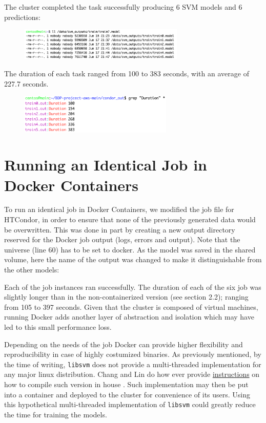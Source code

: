 \documentclass{article}
\begin{document}
The cluster completed the task successfully producing 6 SVM models and 6 predictions: %
\begin{figure}[!h]
    \includegraphics[width=0.7\textwidth]{./img/condor_output.model.png}
\end{figure}
\FloatBarrier%

The duration of each task ranged from 100 to 383 seconds, with an average of 227.7 seconds.

\begin{figure}[!h]
    \includegraphics[width=0.65\textwidth]{./img/condor_duration_job.png}
\end{figure}
\FloatBarrier%

\section{Running an Identical Job in Docker Containers}
To run an identical job in Docker Containers, we modified the job file for HTCondor, 
in order to ensure that none of the previously generated data would be overwritten. 
This was done in part by creating a new output directory reserved for the Docker job output (logs, errors and output).
Note that the universe (line 60) has to be set to docker.
As the model was saved in the shared volume, here the name of the output was changed to make it distinguishable from the other models:

Each of the job instances ran successfully.
The duration of each of the six job was slightly longer than in the non-containerized version (see section 2.2); ranging from 105 to 397 seconds. 
Given that the cluster is composed of virtual machines, running Docker adds another layer of abstraction and isolation which may have led to this small performance loss.

Depending on the needs of the job Docker can provide higher flexibility and reproducibility in case of highly costumized binaries.
As previously mentioned, by the time of writing, \texttt{libsvm} does not provide a multi-threaded implementation for any major linux distribution.
Chang and Lin do how ever provide
\href{http://gourl.gr/c4hm}{instructions} on how to compile such version in house \cite{chang_libsvm_2011}.
Such implementation may then be put into a container and deployed to the cluster for convenience of its users.
Using this hypothetical multi-threaded implementation of \texttt{libsvm} could greatly reduce the time for training the models.
\end{document}
